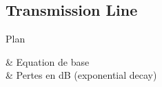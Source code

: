 \subsection[5min-Pascal]{Transmission Line }
\pascalbackground
\begin{frame}{Plan}
    \begin{makelist}[\small][1.5]
        \icon[red]{\faTimes} & Equation de base\\
        \icon[red]{\faTimes} & Pertes en dB (exponential decay)\\
    \end{makelist}
\end{frame}
